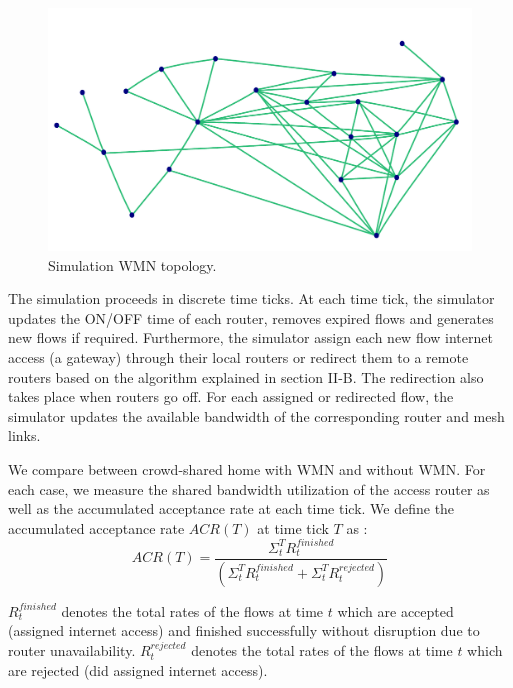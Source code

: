 \begin{figure}[t]
\begin{center}
\includegraphics[width=1\linewidth]{topology.pdf}
\caption{Simulation WMN topology.}
\label{fig:topology}
\end{center}
\end{figure}

The simulation proceeds in discrete time ticks. At each time tick, the simulator updates the ON/OFF time of each router, removes expired flows and generates new flows if required. Furthermore, the simulator assign each new flow internet access (a gateway) through their local routers or redirect them to a remote routers based on the algorithm explained in section II-B. The redirection also takes place when routers go off. For each assigned or redirected flow, the simulator updates the available bandwidth of the corresponding router and mesh links.

We compare between crowd-shared home with WMN and without WMN. For each case, we measure the shared bandwidth utilization of the access router as well as the accumulated acceptance rate at each time tick. We define the accumulated acceptance rate $ACR(T)$ at time tick $T$ as :
\vspace{-3mm}
\begin{equation}\label{1}
ACR(T)= \frac{\Sigma^T_t R^{finished}_{t}}{(\Sigma^T_t R^{finished}_{t} + \Sigma^T_t R^{rejected}_{t})}
\end{equation}
\vspace{-2mm}

$R^{finished}_{t}$ denotes the total rates of the flows at time $t$ which are accepted (assigned internet access) and finished successfully without disruption due to router unavailability. $R^{rejected}_{t}$ denotes the total rates of the flows at time $t$ which are rejected (did assigned internet access). 

